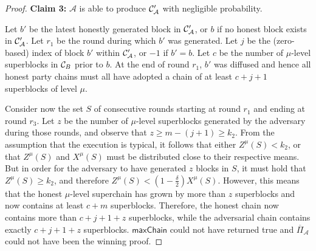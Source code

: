 \begin{proof}
    \textbf{Claim 3: } $\mathcal{A}$ is able to produce $\mathcal{C}'_\mathcal{A}$
    with negligible probability.

    Let $b'$ be the latest honestly generated block in $\mathcal{C}'_\mathcal{A}$,
    or $b$ if no honest block exists in $\mathcal{C}'_\mathcal{A}$. Let $r_1$ be
    the round during which $b'$ was generated. Let $j$ be the (zero-based)
    index of block $b'$ within $\mathcal{C}'_\mathcal{A}$, or $-1$ if $b' = b$. Let
    $c$ be the number of $\mu$-level superblocks in $\mathcal{C}_B$ prior to $b$.
    At the end of round $r_1$, $b'$ was diffused and hence all honest party
    chains must all have adopted a chain of at least $c + j + 1$ superblocks of
    level $\mu$.

    Consider now the set $S$ of consecutive rounds starting at round $r_1$ and
    ending at round $r_3$. Let $z$ be the number of $\mu$-level superblocks
    generated by the adversary during those rounds, and observe that $z \geq m
    - (j + 1) \geq k_2$. From the assumption that the execution is typical, it
    follows that either $Z^\mu(S) < k_2$, or that $Z^\mu(S)$ and $X^\mu(S)$
    must be distributed close to their respective means. But in order for the
    adversary to have generated $z$ blocks in $S$, it must hold that $Z^\mu(S)
    \geq k_2$, and therefore $Z^\mu(S) < (1 - \frac{\delta}{2})X^\mu(S)$. However,
    this means that the honest $\mu$-level superchain has grown by more than
    $z$ superblocks and now contains at least $c + m$ superblocks. Therefore,
    the honest chain now contains more than $c + j + 1 + z$ superblocks, while
    the adversarial chain contains exactly $c + j + 1 + z$ superblocks.
    $\textsf{maxChain}$ could not have returned true and
    $\overline{\Pi}_\mathcal{A}$ could not have been the winning proof.
\end{proof}
